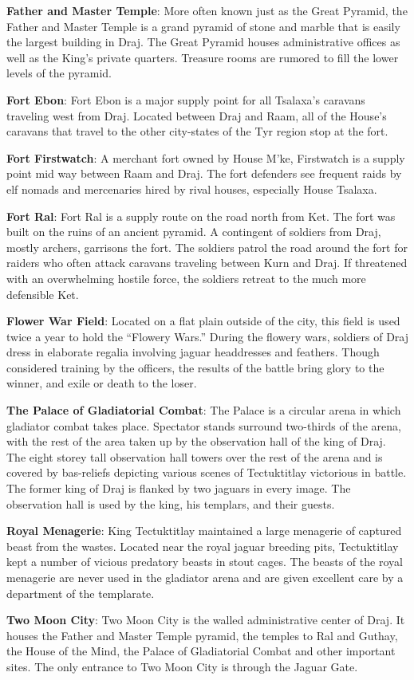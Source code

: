 {
	\textbf{Father and Master Temple}: More often known just as the Great Pyramid, the Father and Master Temple is a grand pyramid of stone and marble that is easily the largest building in Draj. The Great Pyramid houses administrative offices as well as the King's private quarters. Treasure rooms are rumored to fill the lower levels of the pyramid.

	\textbf{Fort Ebon}: Fort Ebon is a major supply point for all Tsalaxa's caravans traveling west from Draj. Located between Draj and Raam, all of the House's caravans that travel to the other city-states of the Tyr region stop at the fort.

	\textbf{Fort Firstwatch}: A merchant fort owned by House M'ke, Firstwatch is a supply point mid way between Raam and Draj. The fort defenders see frequent raids by elf nomads and mercenaries hired by rival houses, especially House Tsalaxa.

	\textbf{Fort Ral}: Fort Ral is a supply route on the road north from Ket. The fort was built on the ruins of an ancient pyramid. A contingent of soldiers from Draj, mostly archers, garrisons the fort. The soldiers patrol the road around the fort for raiders who often attack caravans traveling between Kurn and Draj. If threatened with an overwhelming hostile force, the soldiers retreat to the much more defensible Ket.

	\textbf{Flower War Field}: Located on a flat plain outside of the city, this field is used twice a year to hold the ``Flowery Wars.'' During the flowery wars, soldiers of Draj dress in elaborate regalia involving jaguar headdresses and feathers. Though considered training by the officers, the results of the battle bring glory to the winner, and exile or death to the loser.

	\textbf{The Palace of Gladiatorial Combat}: The Palace is a circular arena in which gladiator combat takes place. Spectator stands surround two-thirds of the arena, with the rest of the area taken up by the observation hall of the king of Draj. The eight storey tall observation hall towers over the rest of the arena and is covered by bas-reliefs depicting various scenes of Tectuktitlay victorious in battle. The former king of Draj is flanked by two jaguars in every image. The observation hall is used by the king, his templars, and their guests.

	\textbf{Royal Menagerie}: King Tectuktitlay maintained a large menagerie of captured beast from the wastes. Located near the royal jaguar breeding pits, Tectuktitlay kept a number of vicious predatory beasts in stout cages. The beasts of the royal menagerie are never used in the gladiator arena and are given excellent care by a department of the templarate.

	\textbf{Two Moon City}: Two Moon City is the walled administrative center of Draj. It houses the Father and Master Temple pyramid, the temples to Ral and Guthay, the House of the Mind, the Palace of Gladiatorial Combat and other important sites. The only entrance to Two Moon City is through the Jaguar Gate.
}
